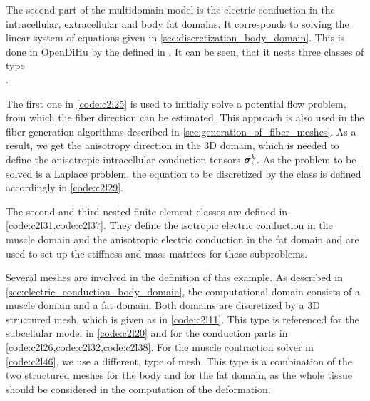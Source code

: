 The second part of the multidomain model is the electric conduction in the intracellular, extracellular and body fat domains. It corresponds to solving the linear system of equations given in \cref{sec:discretization_body_domain}. This is done in OpenDiHu by the  defined in . It can be seen, that it nests three classes of type \\. 

The first one in \cref{code:c2l25} is used to initially solve a potential flow problem, from which the fiber direction can be estimated. This approach \cite{Choi2013} is also used in the fiber generation algorithms described in \cref{sec:generation_of_fiber_meshes}. As a result, we get the anisotropy direction in the 3D domain, which is needed to define the anisotropic intracellular conduction tensors $\boldsymbol{\sigma}_i^k$. As the problem to be solved is a Laplace problem, the equation to be discretized by the class is defined accordingly in \cref{code:c2l29}.

The second and third nested finite element classes are defined in \cref{code:c2l31,code:c2l37}. They define the isotropic electric conduction in the muscle domain and the anisotropic electric conduction in the fat domain and are used to set up the stiffness and mass matrices for these subproblems.

Several meshes are involved in the definition of this example. As described in \cref{sec:electric_conduction_body_domain}, the computational domain consists of a muscle domain and a fat domain. Both domains are discretized by a 3D structured mesh, which is given as  in \cref{code:c2l11}. This type is referenced for the subcellular model in \cref{code:c2l20} and for the conduction parts in \cref{code:c2l26,code:c2l32,code:c2l38}. 
For the muscle contraction solver in \cref{code:c2l46}, we use a different,  type of mesh. This type is a combination of the two structured meshes for the body and for the fat domain, as the whole tissue should be considered in the computation of the deformation.


